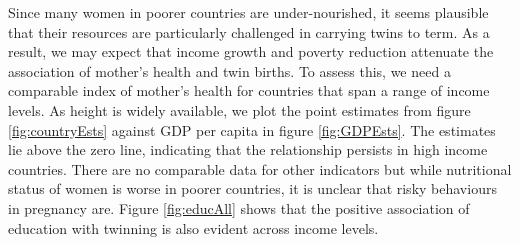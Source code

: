 \documentclass{nature}
\begin{document}
\begin{linenumbers}
Since many women in poorer countries are under-nourished, it seems plausible that their resources are particularly challenged in carrying twins to term. As a result, we may expect that income growth and poverty reduction attenuate the association of mother's health and twin births. To assess this, we need a comparable index of mother's health for countries that span a range of income levels. As height is widely available, we plot the point estimates from figure \ref{fig:countryEsts} against GDP per capita in figure \ref{fig:GDPEsts}. The estimates lie above the zero line, indicating that the relationship persists in high income countries. There are no comparable data for other indicators but while nutritional status of women is worse in poorer countries, it is unclear that risky behaviours in pregnancy are. %
Figure \ref{fig:educAll} shows that the positive association of education with twinning is also evident across income levels. 



\end{linenumbers}
\end{document}
